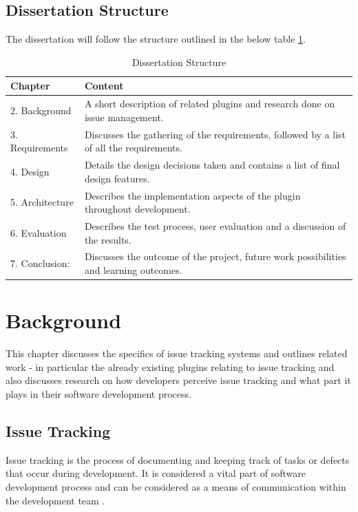 \documentclass{4thYearProject}
\begin{document}
\section{Dissertation Structure}

The dissertation will follow the structure outlined in the below table \ref{table:reportStructure}.

\begin{table}[H]
\centering
\def\arraystretch{1.5}
\begin{tabular}{p{3cm}p{12cm}}
\hline
Chapter & Content \\
\hline
2. Background & A short description of related plugins and research done on issue management. \\
3. Requirements & Discusses the gathering of the requirements, followed by a list of all the requirements. \\
4. Design & Details the design decisions taken and contains a list of final design features.\\
5. Architecture & Describes the implementation aspects of the plugin throughout development.\\
6. Evaluation & Describes the test process, user evaluation and a discussion of the results.\\
7. Conclusion: & Discusses the outcome of the project, future work possibilities and learning outcomes.  \\
\hline
\end{tabular}
\caption{Dissertation Structure}
\label{table:reportStructure}
\end{table}


\chapter{Background}

This chapter discusses the specifics of issue tracking systems and outlines related work - in particular the already existing plugins relating to issue tracking and also discusses research on how developers perceive issue tracking and what part it plays in their software development process.

\section{Issue Tracking}

Issue tracking is the process of documenting and keeping track of tasks or defects that occur during development. It is considered a vital part of software development process and can be considered as a means of communication within the development team \cite{socialnature}.
\end{document}
